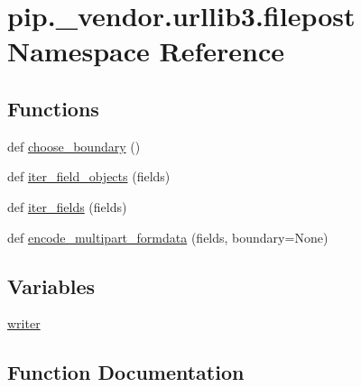 \hypertarget{namespacepip_1_1__vendor_1_1urllib3_1_1filepost}{}\section{pip.\+\_\+vendor.\+urllib3.\+filepost Namespace Reference}
\label{namespacepip_1_1__vendor_1_1urllib3_1_1filepost}
\subsection*{Functions}
\begin{DoxyCompactItemize}
\item 
def \hyperlink{namespacepip_1_1__vendor_1_1urllib3_1_1filepost_ae2a08edcef4e2b5ecab394fbb76f0edc}{choose\+\_\+boundary} ()
\item 
def \hyperlink{namespacepip_1_1__vendor_1_1urllib3_1_1filepost_aa6f4e168f51fa2c26102239a4136b09e}{iter\+\_\+field\+\_\+objects} (fields)
\item 
def \hyperlink{namespacepip_1_1__vendor_1_1urllib3_1_1filepost_a9b0d028edac2a9153f18f7f81c67662d}{iter\+\_\+fields} (fields)
\item 
def \hyperlink{namespacepip_1_1__vendor_1_1urllib3_1_1filepost_affadb40ac270d6fd2c5fe996e77b3ae1}{encode\+\_\+multipart\+\_\+formdata} (fields, boundary=None)
\end{DoxyCompactItemize}
\subsection*{Variables}
\begin{DoxyCompactItemize}
\item 
\hyperlink{namespacepip_1_1__vendor_1_1urllib3_1_1filepost_a2a5d5572fb732d51d8b96d026cfdfb87}{writer}
\end{DoxyCompactItemize}


\subsection{Function Documentation}
\mbox{\label{namespacepip_1_1__vendor_1_1urllib3_1_1filepost_ae2a08edcef4e2b5ecab394fbb76f0edc}} 
